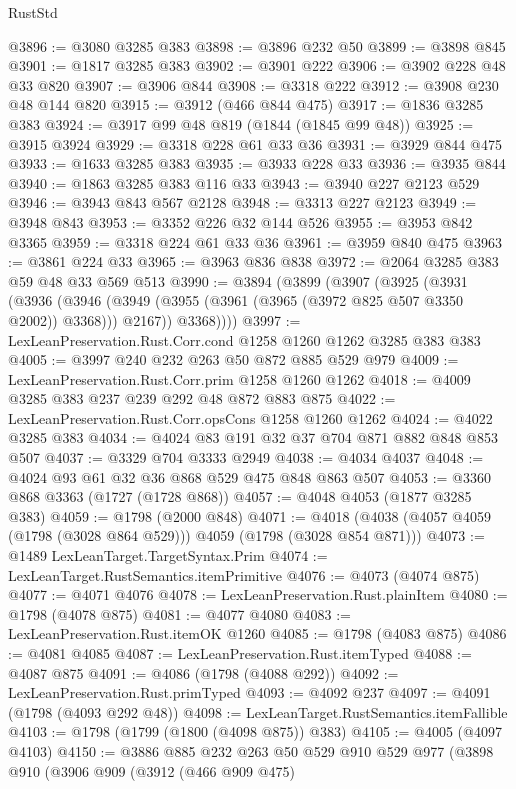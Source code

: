 \begin{lexlean}{RustStd}
\begin{coremodule}
@3896 := @3080 @3285 @383
@3898 := @3896 @232 @50
@3899 := @3898 @845
@3901 := @1817 @3285 @383
@3902 := @3901 @222
@3906 := @3902 @228 @48 @33 @820
@3907 := @3906 @844
@3908 := @3318 @222
@3912 := @3908 @230 @48 @144 @820
@3915 := @3912 (@466 @844 @475)
@3917 := @1836 @3285 @383
@3924 := @3917 @99 @48 @819 (@1844 (@1845 @99 @48))
@3925 := @3915 @3924
@3929 := @3318 @228 @61 @33 @36
@3931 := @3929 @844 @475
@3933 := @1633 @3285 @383
@3935 := @3933 @228 @33
@3936 := @3935 @844
@3940 := @1863 @3285 @383 @116 @33
@3943 := @3940 @227 @2123 @529
@3946 := @3943 @843 @567 @2128
@3948 := @3313 @227 @2123
@3949 := @3948 @843
@3953 := @3352 @226 @32 @144 @526
@3955 := @3953 @842 @3365
@3959 := @3318 @224 @61 @33 @36
@3961 := @3959 @840 @475
@3963 := @3861 @224 @33
@3965 := @3963 @836 @838
@3972 := @2064 @3285 @383 @59 @48 @33 @569 @513
@3990 := @3894
    (@3899
      (@3907
        (@3925
          (@3931
            (@3936
              (@3946 (@3949 (@3955 (@3961 (@3965 (@3972 @825 @507 @3350 @2002)) @3368))) @2167))
            @3368))))
@3997 := LexLeanPreservation.Rust.Corr.cond @1258 @1260 @1262 @3285 @383 @383
@4005 := @3997 @240 @232 @263 @50 @872 @885 @529 @979
@4009 := LexLeanPreservation.Rust.Corr.prim @1258 @1260 @1262
@4018 := @4009 @3285 @383 @237 @239 @292 @48 @872 @883 @875
@4022 := LexLeanPreservation.Rust.Corr.opsCons @1258 @1260 @1262
@4024 := @4022 @3285 @383
@4034 := @4024 @83 @191 @32 @37 @704 @871 @882 @848 @853 @507
@4037 := @3329 @704 @3333 @2949
@4038 := @4034 @4037
@4048 := @4024 @93 @61 @32 @36 @868 @529 @475 @848 @863 @507
@4053 := @3360 @868 @3363 (@1727 (@1728 @868))
@4057 := @4048 @4053 (@1877 @3285 @383)
@4059 := @1798 (@2000 @848)
@4071 := @4018 (@4038 (@4057 @4059 (@1798 (@3028 @864 @529))) @4059 (@1798 (@3028 @854 @871)))
@4073 := @1489 LexLeanTarget.TargetSyntax.Prim
@4074 := LexLeanTarget.RustSemantics.itemPrimitive
@4076 := @4073 (@4074 @875)
@4077 := @4071 @4076
@4078 := LexLeanPreservation.Rust.plainItem
@4080 := @1798 (@4078 @875)
@4081 := @4077 @4080
@4083 := LexLeanPreservation.Rust.itemOK @1260
@4085 := @1798 (@4083 @875)
@4086 := @4081 @4085
@4087 := LexLeanPreservation.Rust.itemTyped
@4088 := @4087 @875
@4091 := @4086 (@1798 (@4088 @292))
@4092 := LexLeanPreservation.Rust.primTyped
@4093 := @4092 @237
@4097 := @4091 (@1798 (@4093 @292 @48))
@4098 := LexLeanTarget.RustSemantics.itemFallible
@4103 := @1798 (@1799 (@1800 (@4098 @875)) @383)
@4105 := @4005 (@4097 @4103)
@4150 := @3886
    @885
    @232
    @263
    @50
    @529
    @910
    @529
    @977
    (@3898
      @910
      (@3906
        @909
        (@3912
          (@466 @909 @475)

\end{coremodule}
\end{lexlean}
